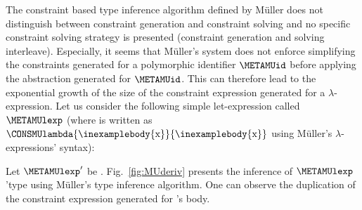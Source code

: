 \documentclass{jfp1}
\begin{document}
The constraint based type inference algorithm defined by M\"{u}ller
does not distinguish between constraint generation and constraint
solving and no specific constraint solving strategy is presented
(constraint generation and solving interleave).
%
Especially, it seems that M\"{u}ller's system does not enforce
simplifying the constraints generated for a polymorphic identifier
$\METAMUid$ before applying the abstraction generated for $\METAMUid$.
This can therefore lead to the exponential growth of the size of the
constraint expression generated for a $\lambda$-expression.  Let us
consider the following simple let-expression called $\METAMUlexp$
(where  is written as
$\CONSMUlambda{\mbox{\inexamplebody{x}}}{\mbox{\inexamplebody{x}}}$
using M\"{u}ller's $\lambda$-expressions' syntax):


Let $\METAMUlexp'$ be .
Fig.~\ref{fig:MUderiv} presents the inference of $\METAMUlexp$'type
using M\"{u}ller's type inference algorithm.  One can observe the
duplication of the constraint expression generated for
's body.
\end{document}

